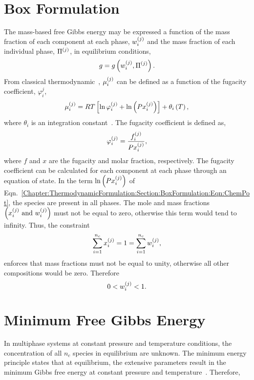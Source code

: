 \section{Box Formulation}\label{Chapter:ThermodynamicFormulation:Section:BoxFormulation}
The mass-based free Gibbs energy may be expressed a function of the mass fraction of each component at each phase, $\mfr[w]{i}{j}$ and the mass fraction of each individual phase, $\mfr[\Pi]{}{j}$, in equilibrium conditions,
\begin{displaymath}
   g = g\left(\mfr[w]{i}{j},\mfr[\Pi]{}{j}\right).
\end{displaymath}
From classical thermodynamic~\citep{Balmer_Book}, $\mfr[\mu]{i}{j}$ can be defined as a function of the fugacity coefficient, $\varphi_{i}^{j}$,
\begin{equation}
   \mfr[\mu]{i}{j}= R T\left[\ln{\mfr[\varphi]{i}{j}} + \ln{\left(P \mfr[x]{i}{j}\right)}\right] + \theta_{i}\left(T\right),\label{Chapter:ThermodynamicFormulation:Section:BoxFormulation:Eqn:ChemPot}
\end{equation}
where $\theta_{i}$ is an integration constant~\citep{SmithVanNess_Book}. The fugacity coefficient is defined as,
\begin{equation}
   \mfr[\varphi]{i}{j} = \frc{\mfr[f]{i}{j}}{P \mfr[x]{i}{j}},\label{Chapter:ThermodynamicFormulation:Section:BoxFormulation:Eqn:FugacityCoeff}
\end{equation}
where $f$ and $x$ are the fugacity and molar fraction, respectively. The fugacity coefficient can be calculated for each component at each phase through an equation of state. In the term $\ln{\left(P\mfr[x]{i}{j}\right)}$ of Eqn.~\ref{Chapter:ThermodynamicFormulation:Section:BoxFormulation:Eqn:ChemPot}, the species are present in all phases. The mole and mass fractions $\left(\mfr[x]{i}{j}\text{ and }\mfr[w]{i}{j}\right)$ must not be equal to zero, otherwise this term would tend to infinity. Thus, the constraint
  \begin{displaymath}
    \summation_{i=1}^{n_{c}} \mfr[x]{i}{j} = 1 = \summation_{i=1}^{n_{c}} \mfr[w]{i}{j},
  \end{displaymath}
enforces that mass fractions must not be equal to unity, otherwise all other compositions would be zero. Therefore
   \begin{displaymath}
        0 < \mfr[w]{i}{j} < 1.
   \end{displaymath}

\section{Minimum Free Gibbs Energy}\label{Chapter:ThermodynamicFormulation:Section:MinimumGibbsEnergy}
In multiphase systems at constant pressure and temperature conditions, the concentration of all $n_{c}$ species in equilibrium are unknown. The minimum energy principle states that at equilibrium, the extensive parameters result in the minimum Gibbs free energy at constant pressure and temperature~\citep{Callen_Book}. Therefore,  


